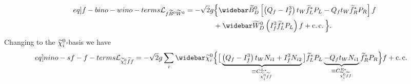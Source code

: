 \documentclass[english, notitlepage]{article}
\begin{document}
            \begin{align}
                \label[eq]{f-bino-wino-terms}
                \nonumber
                \L_{f\bino\wino} = -\sqrt{2} g & \Big\{ \wbar{\wtilde{B}}^0_D \bclosed{ \pclosed{Q_f - I^3_f}t_W \wtilde{f}_L^* P_L - Q_f t_W \wtilde{f}_R^* P_R } f \\
                                               & + \wbar{\wtilde{W}}^0_D \pclosed{I^3_f \wtilde{f}_L^* P_L} f + \cc \Big\}.
            \end{align}
            Changing to the $\nino[i]$-basis we have
            \begin{align}
                \label[eq]{nino-sf-f-terms}
                \L_{\nino[i]\wtilde{f}f} = -\sqrt{2} g   \sum_{i} \wbar{\wtilde{\chi}}^0_i & \Big\{ \big[ \underbrace{\pclosed{Q_f - I^3_f}t_W N_{i1}  + I^3_f N_{i2}}_{\equiv C_{\nino[i] \wtilde{f} f}^{L*}} \big] \wtilde{f}_L^* P_L \underbrace{- Q_f t_W N_{i1}}_{\equiv C_{\nino[i] \wtilde{f} f}^{R*}} \wtilde{f}_R^* P_R \Big\} f + \cc
            \end{align}
\end{document}
